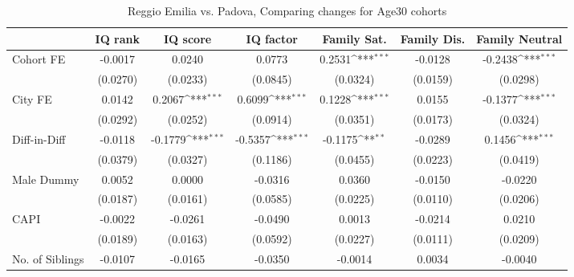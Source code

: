 \documentclass{article}
\begin{document}
\begin{table}[htbp]\centering
\def\sym#1{\ifmmode^{#1}\else\(^{#1}\)\fi}
\caption{Reggio Emilia vs. Padova, Comparing changes for Age30 cohorts}
\begin{tabular}{l*{6}{c}}
\toprule
            &\multicolumn{1}{c}{IQ rank}&\multicolumn{1}{c}{IQ score}&\multicolumn{1}{c}{IQ factor}&\multicolumn{1}{c}{Family Sat.}&\multicolumn{1}{c}{Family Dis.}&\multicolumn{1}{c}{Family Neutral}\\
\midrule
Cohort FE   &     -0.0017         &      0.0240         &      0.0773         &      0.2531\sym{***}&     -0.0128         &     -0.2438\sym{***}\\
            &    (0.0270)         &    (0.0233)         &    (0.0845)         &    (0.0324)         &    (0.0159)         &    (0.0298)         \\
\addlinespace
City FE     &      0.0142         &      0.2067\sym{***}&      0.6099\sym{***}&      0.1228\sym{***}&      0.0155         &     -0.1377\sym{***}\\
            &    (0.0292)         &    (0.0252)         &    (0.0914)         &    (0.0351)         &    (0.0173)         &    (0.0324)         \\
\addlinespace
Diff-in-Diff&     -0.0118         &     -0.1779\sym{***}&     -0.5357\sym{***}&     -0.1175\sym{**} &     -0.0289         &      0.1456\sym{***}\\
            &    (0.0379)         &    (0.0327)         &    (0.1186)         &    (0.0455)         &    (0.0223)         &    (0.0419)         \\
\addlinespace
Male Dummy  &      0.0052         &      0.0000         &     -0.0316         &      0.0360         &     -0.0150         &     -0.0220         \\
            &    (0.0187)         &    (0.0161)         &    (0.0585)         &    (0.0225)         &    (0.0110)         &    (0.0206)         \\
\addlinespace
CAPI        &     -0.0022         &     -0.0261         &     -0.0490         &      0.0013         &     -0.0214         &      0.0210         \\
            &    (0.0189)         &    (0.0163)         &    (0.0592)         &    (0.0227)         &    (0.0111)         &    (0.0209)         \\
\addlinespace
No. of Siblings&     -0.0107         &     -0.0165         &     -0.0350         &     -0.0014         &      0.0034         &     -0.0040         \\

\end{tabular}
\end{table}
\end{document}
